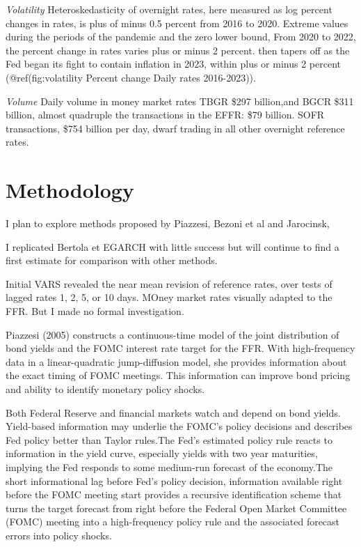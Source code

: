 \documentclass[
]{article}
\begin{document}
\emph{Volatility}
Heteroskedasticity of overnight rates, here measured as log percent changes in rates, is plus of minus 0.5 percent from 2016 to 2020. Extreme values during the periods of the pandemic and the zero lower bound, From 2020 to 2022, the percent change in rates varies plus or minus 2 percent. then tapers off as the Fed began its fight to contain inflation in 2023, within plus or minus 2 percent (@ref(fig:volatility Percent change Daily rates 2016-2023)).

\emph{Volume}
Daily volume in money market rates TBGR \$297 billion,and BGCR \$311 billion, almost quadruple the transactions in the EFFR: \$79 billion. SOFR transactions, \$754 billion per day, dwarf trading in all other overnight reference rates.

\hypertarget{methodology}{%
\section{Methodology}\label{methodology}}

I plan to explore methods proposed by Piazzesi, Bezoni et al and Jarocinsk,

I replicated Bertola et EGARCH with little success but will continue to find a first estimate for comparison with other methods.

Initial VARS revealed the near mean revision of reference rates, over tests of lagged rates 1, 2, 5, or 10 days. MOney market rates visually adapted to the FFR. But I made no formal investigation.

Piazzesi (2005) constructs a continuous-time model of the joint distribution of bond yields and the FOMC interest rate target for the FFR. With high-frequency data in a linear-quadratic jump-diffusion model, she provides information about the exact timing of FOMC meetings. This information can improve bond pricing and ability to identify monetary policy shocks.

Both Federal Reserve and financial markets watch and depend on bond yields. Yield-based information may underlie the FOMC's policy decisions and describes Fed policy better than Taylor rules.The Fed's estimated policy rule reacts to information in the yield curve, especially yields with two year maturities, implying the Fed responds to some medium-run forecast of the economy.The short informational lag before Fed's policy decision, information available right before the FOMC meeting start provides a recursive identification scheme that turns the target forecast from right before the Federal Open Market Committee (FOMC) meeting into a high-frequency policy rule and the associated forecast errors into policy shocks.
\end{document}
